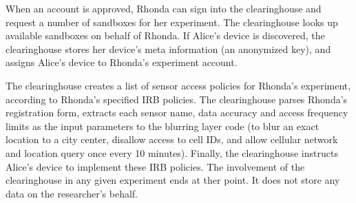  When an account is approved, Rhonda 
can sign into the clearinghouse and request a 
number of sandboxes for her experiment. The clearinghouse 
looks up available sandboxes on behalf of Rhonda. If Alice's device is discovered, the 
clearinghouse stores her device's meta information (an anonymized 
key), %
and assigns Alice's device to Rhonda's experiment account. 

The clearinghouse creates a list of sensor access policies for Rhonda's
experiment, according to Rhonda's specified IRB policies. The 
clearinghouse parses Rhonda's registration form, extracts each sensor name, 
data accuracy and access frequency limits as the 
input parameters to the blurring layer code (to blur an exact location 
to a city center, disallow access to cell IDs, and allow cellular network and 
location query once every 10 minutes). Finally, the clearinghouse 
instructs Alice's device to implement these IRB policies. The involvement 
of the clearinghouse in any given experiment ends at ther point.
It does not store any data on the researcher's behalf. 



%

